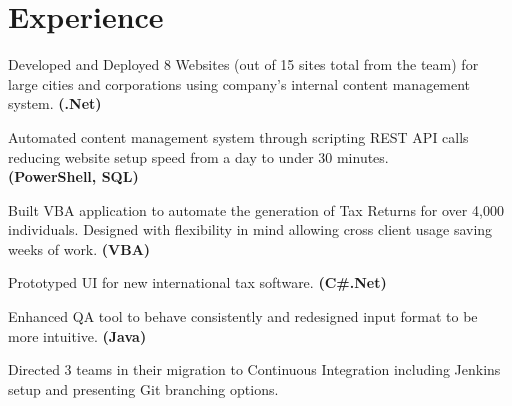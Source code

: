 \documentclass[letterpaper]{kevin-resume} %
\begin{document}
\hfill
%
%
\begin{minipage}[t]{0.66\textwidth} %


\section{Experience}

\vspace{\topsep} %
\begin{tightitemize}
	\item Developed and Deployed 8 Websites (out of 15 sites total from the team) for large cities and corporations using company's internal content management system. \textbf{(.Net)}
	\item Automated content management system through scripting REST API calls reducing website setup speed from a day to under 30 minutes. \\ \textbf{(PowerShell, SQL)}
\end{tightitemize}

\sectionspace %


\begin{tightitemize}
	\item Built VBA application to automate the generation of Tax Returns for over 4,000 individuals. Designed with flexibility in mind allowing cross client usage saving weeks of work. \textbf{(VBA)}
	\item Prototyped UI for new international tax software. \textbf{(C\#.Net)}
\end{tightitemize}

\sectionspace %


\begin{tightitemize}
	\item Enhanced QA tool to behave consistently and redesigned input format to be more intuitive. \textbf{(Java)}
	\item Directed 3 teams in their migration to Continuous Integration including Jenkins setup and presenting Git branching options.
\end{tightitemize}


\end{minipage}
\end{document}
